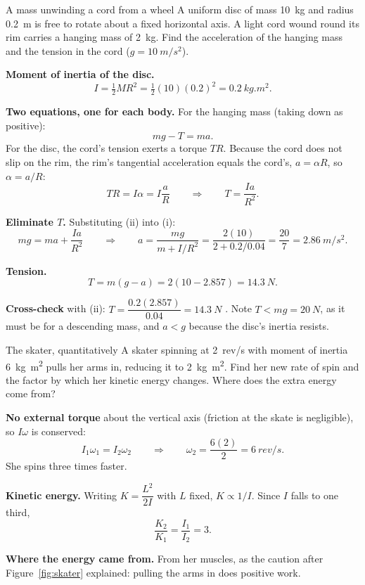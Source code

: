 \begin{exbox}{A mass unwinding a cord from a wheel}
A uniform disc of mass \SI{10}{kg} and radius \SI{0.2}{m} is free to rotate about a fixed horizontal
axis. A light cord wound round its rim carries a hanging mass of \SI{2}{kg}. Find the acceleration of
the hanging mass and the tension in the cord ($g=\SI{10}{m/s^2}$).

 \textbf{Moment of inertia of the disc.}
\[
I=\tfrac{1}{2}MR^{2}=\tfrac{1}{2}(10)(0.2)^{2}=\SI{0.2}{kg.m^2}.
\]

 \textbf{Two equations, one for each body.} For the hanging mass (taking down as positive):
\[
mg-T=ma. \tag{i}
\]
For the disc, the cord's tension exerts a torque $TR$. Because the cord does not slip on the rim, the rim's
tangential acceleration equals the cord's, $a=\alpha R$, so $\alpha=a/R$:
\[
TR=I\alpha=I\frac{a}{R}
\qquad\Longrightarrow\qquad
T=\frac{Ia}{R^{2}}. \tag{ii}
\]

 \textbf{Eliminate $T$.} Substituting (ii) into (i):
\[
mg=ma+\frac{Ia}{R^{2}}
\qquad\Longrightarrow\qquad
a=\frac{mg}{m+I/R^{2}}=\frac{2(10)}{2+0.2/0.04}=\frac{20}{7}=\SI{2.86}{m/s^2}.
\]

 \textbf{Tension.}
\[
T=m(g-a)=2(10-2.857)=\SI{14.3}{N}.
\]

 \textbf{Cross-check} with (ii): $T=\dfrac{0.2(2.857)}{0.04}=\SI{14.3}{N}$ \checkmark. Note
$T<mg=\SI{20}{N}$, as it must be for a descending mass, and $a<g$ because the disc's inertia resists.
\end{exbox}

\begin{exbox}{The skater, quantitatively}
A skater spinning at \SI{2}{rev/s} with moment of inertia \SI{6}{kg.m^2} pulls her arms in, reducing it
to \SI{2}{kg.m^2}. Find her new rate of spin and the factor by which her kinetic energy changes. Where
does the extra energy come from?

 \textbf{No external torque} about the vertical axis (friction at the skate is negligible), so
$I\omega$ is conserved:
\[
I_1\omega_1=I_2\omega_2
\qquad\Longrightarrow\qquad
\omega_2=\frac{6(2)}{2}=\SI{6}{rev/s}.
\]
She spins three times faster.

 \textbf{Kinetic energy.} Writing $K=\dfrac{L^{2}}{2I}$ with $L$ fixed, $K\propto1/I$. Since
$I$ falls to one third,
\[
\frac{K_2}{K_1}=\frac{I_1}{I_2}=3 .
\]

 \textbf{Where the energy came from.} From her muscles, as the caution after Figure~\ref{fig:skater}
explained: pulling the arms in does positive work. 
\end{exbox}

